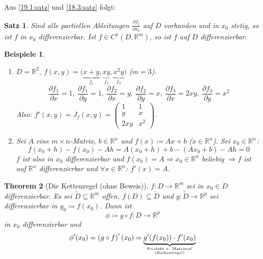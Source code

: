 \documentclass[12pt]{extreport} %
\newcommand{\R}{\mathbb{R}}
\theoremstyle{named}
\newtheorem{unnamedtheorem}{Theorem} \counterwithin{unnamedtheorem}{chapter}
\theoremstyle{nnamed}
\theoremstyle{itshape}
\newtheorem{satz}[unnamedtheorem]{Satz}
\theoremstyle{normal}
\newtheorem*{beispiele}{Beispiele}
\begin{document}
Aus \ref{19.1:satz} und \ref{18.3:satz} folgt:

\begin{satz} \label{19.2:satz}
	Sind alle partiellen Ableitungen $\frac{\partial f_{j}}{\partial x_{k}}$ auf $D$ vorhanden und in $x_{0}$ stetig, so ist $f$ in $x_{0}$ differenzierbar. Ist $f \in C^{1}(D, \R^{m})$, so ist $f$ auf $D$ differenzierbar.
\end{satz}


\begin{beispiele} ~\
	\begin{enumerate}
		\item $D = \R^{2}$, $f(x, y) = \Big( \underbrace{x + y}_{f_{1}}, \underbrace{xy}_{f_{2}}, \underbrace{x^{2}y}_{f_{3}} \Big)$ ($m = 3$).
			$$ \frac{\partial f_{1}}{\partial x} = 1, ~ \frac{\partial f_{1}}{\partial y} = 1, ~ \frac{\partial f_{2}}{\partial x} = y, ~ \frac{\partial f_{2}}{\partial y} = x, ~ \frac{\partial f_{3}}{\partial x} = 2xy, ~ \frac{\partial f_{3}}{\partial y} = x^{2} $$
			Also: $f'(x, y) = J_{f}(x, y) = \begin{pmatrix} 1 & 1 \\ y & x \\ 2xy & x^{2} \end{pmatrix}$.
		\item Sei $A$ eine $m \times n$-Matrix, $b \in \R^{n}$ und $f(x) \coloneqq Ax + b$ ($x \in \R^{n}$). Sei $x_{0} \in \R^{n}$:
			$$ f(x_{0} + h) - f(x_{0}) - Ah = A(x_{0} + h) + b - (Ax_{0} + b) - Ah = 0 $$
			$f$ ist also in $x_{0}$ differenzierbar und $f(x_{0}) = A \Rightarrow x_{0} \in \R^{n}$ beliebig $\Rightarrow f$ ist auf $\R^{n}$ differenzierbar und $\forall x \in \R^{n}$: $f'(x) = A$.
	\end{enumerate}
\end{beispiele}


\begin{unnamedtheorem}[Die Kettenregel (ohne Beweis)] \label{19.3:satz}
	$f \colon D \rightarrow \R^{m}$ sei in $x_{0} \in D$ differenzierbar. Es sei $\tilde{D} \subseteq \R^{m}$ offen, $f(D) \subseteq \tilde{D}$ und $g \colon \tilde{D} \rightarrow \R^{p}$ sei differenzierbar in $y_{0} \coloneqq f(x_{0})$. Dann ist
		$$ \phi \coloneqq g \circ f \colon D \rightarrow \R^{p} $$
		in $x_{0}$ differenzierbar und 
		$$ \phi'(x_{0}) = \left( g \circ f \right)'(x_{0}) = \underbrace{g'(f(x_{0})) \cdot f'(x_{0})}_{\genfrac{}{}{0pt}{}{\text{Produkt v. Matrizen!}}{\text{(Reihenfolge!)}}}  $$
\end{unnamedtheorem}
\end{document}
